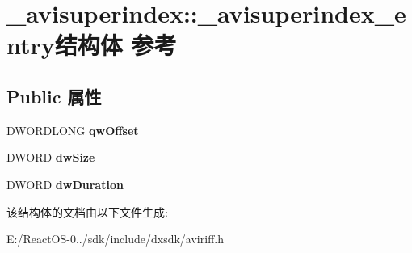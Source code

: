 \hypertarget{struct__avisuperindex_1_1__avisuperindex__entry}{}\section{\+\_\+avisuperindex\+:\+:\+\_\+avisuperindex\+\_\+entry结构体 参考}
\label{struct__avisuperindex_1_1__avisuperindex__entry}
\subsection*{Public 属性}
\begin{DoxyCompactItemize}
\item 
\mbox{\label{struct__avisuperindex_1_1__avisuperindex__entry_ace7d7fe1ec599e77270e927917016dc2}} 
D\+W\+O\+R\+D\+L\+O\+NG {\bfseries qw\+Offset}
\item 
\mbox{\label{struct__avisuperindex_1_1__avisuperindex__entry_a4da2f3f005a4e299b5b18dc58a8f48c2}} 
D\+W\+O\+RD {\bfseries dw\+Size}
\item 
\mbox{\label{struct__avisuperindex_1_1__avisuperindex__entry_a3e7f23a1e780983bccb941a4734578f6}} 
D\+W\+O\+RD {\bfseries dw\+Duration}
\end{DoxyCompactItemize}


该结构体的文档由以下文件生成\+:\begin{DoxyCompactItemize}
\item 
E\+:/\+React\+O\+S-\/0../sdk/include/dxsdk/aviriff.\+h\end{DoxyCompactItemize}
